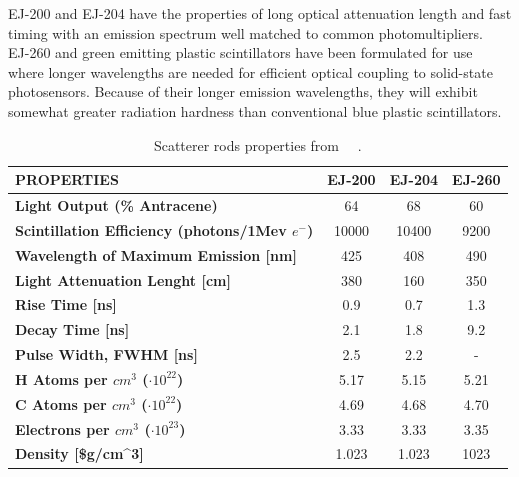 \documentclass[10pt,a4paper, openany]{book}
\begin{document}
EJ-200 and EJ-204 have the properties of long optical attenuation length and fast timing with an emission spectrum well matched to common photomultipliers.\\
EJ-260 and green emitting plastic scintillators have been formulated for use where longer wavelengths are needed for efficient optical coupling to solid-state photosensors. Because of their longer emission wavelengths, they will exhibit somewhat greater radiation hardness than conventional blue plastic scintillators. 

\begin{table}[!h]
\centering
\caption{Scatterer rods properties from~\cite{ej:1} ~\cite{ej:2}.}
\label{tab:ej}
\begin{tabular}{lccc}
\toprule
\textbf{PROPERTIES}                                             & \textbf{EJ-200}     & \textbf{EJ-204}    & \textbf{EJ-260}   \\
\midrule
\textbf{Light Output (\% Antracene)}                   & 64                  & 68                 & 60                \\
\textbf{Scintillation Efficiency (photons/1Mev $e^-$)} & 10000               & 10400              & 9200              \\
\textbf{Wavelength of Maximum Emission {[}nm{]}}       & 425                 & 408                & 490               \\
\textbf{Light Attenuation Lenght {[}cm{]}}             & 380                 & 160                & 350               \\
\textbf{Rise Time {[}ns{]}}                            & 0.9                 & 0.7                & 1.3               \\
\textbf{Decay Time {[}ns{]}}                           & 2.1                 & 1.8                & 9.2               \\
\textbf{Pulse Width, FWHM {[}ns{]}}                    & 2.5                 & 2.2                & -                 \\
\textbf{H Atoms per $cm^3$ ($\cdot 10^{22}$)}          & 5.17                & 5.15               & 5.21              \\
\textbf{C Atoms per $cm^3$ ($\cdot 10^{22}$)}          & 4.69                & 4.68               & 4.70              \\
\textbf{Electrons per $cm^3$ ($\cdot 10^{23}$)}        & 3.33                & 3.33               & 3.35              \\
\textbf{Density {[}\$g/cm\textasciicircum 3{]}}        & 1.023               & 1.023              & 1023              \\

\end{tabular}
\end{table}
\end{document}
